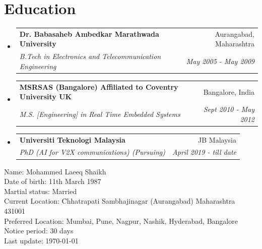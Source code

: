 \documentclass[letterpaper,11pt]{article}
\makeatletter
\newcommand{\resumeItem}[1]{
  \item\small{
    {#1 \vspace{-2pt}}
  }
}
\newcommand{\resumeSubheading}[4]{
  \vspace{-2pt}\item
    \begin{tabular*}{0.97\textwidth}[t]{l@{\extracolsep{\fill}}r}
      \textbf{#1} & #2 \\
      \textit{\small#3} & \textit{\small #4} \\
    \end{tabular*}\vspace{-7pt}
}
\newcommand{\resumeSubHeadingListStart}{\begin{itemize}[leftmargin=0.15in, label={}]}
\newcommand{\resumeSubHeadingListEnd}{\end{itemize}}
\newcommand{\resumeItemListEnd}{\end{itemize}\vspace{-5pt}}
\makeatother
\begin{document}



\section{Education}
  \resumeSubHeadingListStart
    \resumeSubheading
      {Dr. Babasaheb Ambedkar Marathwada University}{Aurangabad, Maharashtra}
      {B.Tech in Electronics and Telecommunication Engineering}{May 2005 - May 2009}
    \resumeSubheading
      {MSRSAS (Bangalore) Affiliated to Coventry University UK}{Bangalore, India}
      {M.S. [Engineering] in Real Time Embedded Systems}{Sept 2010 - May 2012}
      \resumeSubheading
      {Universiti Teknologi Malaysia}{JB Malaysia}
      {PhD (AI for V2X communications) (Pursuing)}{April 2019 - till date}

  \resumeSubHeadingListEnd
\begin{center}
    
        \vspace{3mm}
        Name: Mohammed Laeeq Shaikh\\
        
        Date of birth: 11th March 1987\\
        
        Martial status: Married\\
        
        Current Location: Chhatrapati Sambhajinagar (Aurangabad) Maharashtra 431001\\
        
        Preferred Location: Mumbai, Pune, Nagpur, Nashik, Hyderabad, Bangalore \\
        
        Notice period: 30 days\\
        \vspace{3mm}
        Last update: \today \\
        \vspace{3mm}

\end{center}
\end{document}
